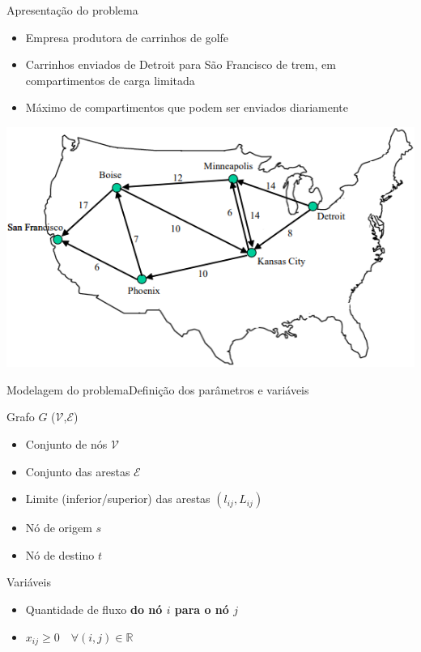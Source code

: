 \documentclass{beamer}
\newenvironment{outeritemize}{\begin{itemize}}{\end{itemize}\vspace{12pt}}
\begin{document}
\begin{frame}{Apresentação do problema}

\begin{outeritemize}
    \item Empresa produtora de carrinhos de golfe
    \item Carrinhos enviados de Detroit para São Francisco de trem, em compartimentos de carga limitada
    \item Máximo de compartimentos que podem ser enviados diariamente
\end{outeritemize}

\begin{center}
\includegraphics[scale=0.45]{assets/FluxoMaximo/Screenshot_2.png}    
\end{center}

\end{frame}

\begin{frame}{Modelagem do problema}{Definição dos parâmetros e variáveis}

Grafo $G$ ($\mathcal{V}$,$\mathcal{E}$)
\begin{outeritemize}
    \item Conjunto de nós $\mathcal{V}$
    \item Conjunto das arestas $\mathcal{E}$
    \item Limite (inferior/superior) das arestas $(l_{ij}, L_{ij})$
    \item Nó de origem $s$
    \item Nó de destino $t$
\end{outeritemize}

Variáveis
\begin{outeritemize}
    \item Quantidade de fluxo \textbf{do nó $i$ para o nó $j$}
    \item $x_{ij}\geq 0\quad\forall (i,j)\in \mathbb{R}$
\end{outeritemize}

\end{frame}
\end{document}
